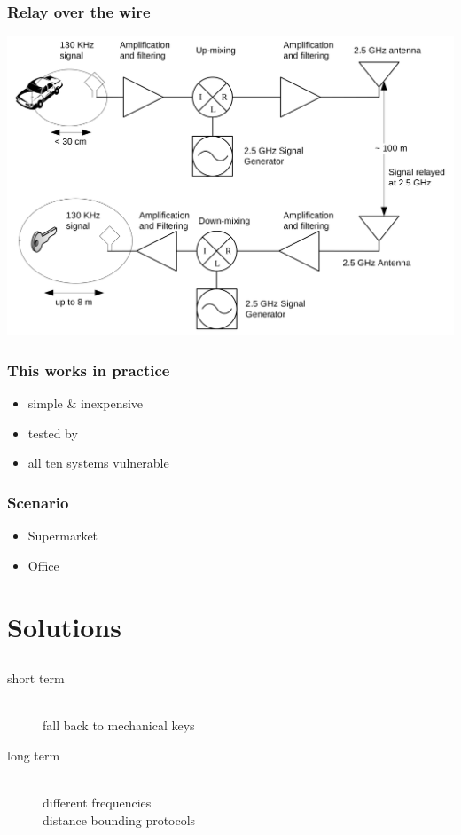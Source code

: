 \documentclass[12pt]{beamer}
\begin{document}
	\begin{frame}
		\frametitle{Relay over the wire}
		\begin{center}
			\includegraphics[scale=0.75]{img/franc_relay_over_the_air.png} 	
		\end{center}
	\end{frame}

	\begin{frame}
		\frametitle{This works in practice}
		\begin{itemize}
			\item simple \& inexpensive
			\item tested by \citet*{relayAttacksFranc}
			\item all ten systems vulnerable
		\end{itemize}
	\end{frame}

	\begin{frame}
		\frametitle{Scenario}
		\begin{itemize}
			\item Supermarket
			\item Office
		\end{itemize}
	\end{frame}

\section{Solutions}
\subsection*{}
	\begin{frame}
		\frametitle{}
		\begin{description}
			\item[short term] \hfill \\
				fall back to mechanical keys
			\item[long term] \hfill \\
					different frequencies \\
					distance bounding protocols
		\end{description}
	\end{frame}
\end{document}
